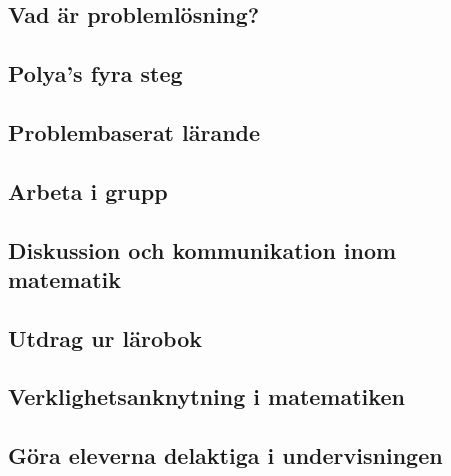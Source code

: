 \documentclass[11pt,a4paper]{article}
\begin{document}
    \subsection{Vad är problemlösning?}
        \label{sec:problemdef}
        
    
    \subsection{Polya's fyra steg}
        \label{sec:polya}
        
        
    \subsection{Problembaserat lärande}
        \label{sec:pbl}
        
        
    \subsection{Arbeta i grupp}
        \label{sec:Arbetaigrupp}
        
        
    \subsection{Diskussion och kommunikation inom matematik}
        
        \label{sec:Diskussion}
    
    \subsection{Utdrag ur lärobok}
        
        
    \subsection{Verklighetsanknytning i matematiken}
        \label{sec:Verklighetsanknytning}
        
        
    \subsection{Göra eleverna delaktiga i undervisningen}
        \label{sec:delaktighet}
        
        
\end{document}

